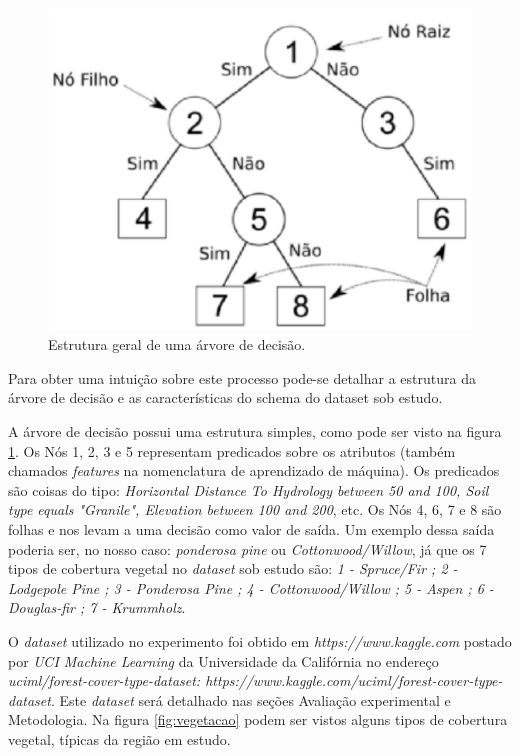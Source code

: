 \documentclass[12pt]{article}
\begin{document}
\begin{figure}[!ht]
	\centering
	\begin{minipage}[t]{0.35\textwidth}
        \includegraphics[width=\textwidth]{img/arvore.png}
        \centering
	\end{minipage}
	\caption
	{
	    Estrutura geral de uma árvore de decisão.
	}
	\label{fig:arvore}
\end{figure}

Para obter uma intuição sobre este processo pode-se detalhar a estrutura da árvore de decisão e as características do schema do dataset sob estudo.  

A árvore de decisão possui uma estrutura simples, como pode ser visto na figura \ref{fig:arvore}.  Os Nós 1, 2, 3 e 5 representam predicados sobre os atributos (também chamados \emph{features} na nomenclatura de aprendizado de máquina). Os predicados são coisas do tipo: \emph{Horizontal Distance To Hydrology between 50 and 100, Soil type equals "Granile", Elevation between 100 and 200}, etc.
Os Nós 4, 6, 7 e 8 são folhas e nos levam a uma decisão como valor de saída. Um exemplo dessa saída poderia ser, no nosso caso: \emph{ponderosa pine} ou \emph{Cottonwood/Willow}, já que os 7 tipos de cobertura vegetal no \emph{dataset} sob estudo são:
\emph{1 - Spruce/Fir ; 2 - Lodgepole Pine  ; 3 - Ponderosa Pine  ; 4 - Cottonwood/Willow  ; 5 - Aspen  ;   6 - Douglas-fir  ;  7 - Krummholz}.

O \emph{dataset} utilizado no experimento foi obtido em \emph{https://www.kaggle.com}  postado por \emph{UCI Machine Learning} da Universidade da Califórnia no endereço \emph{uciml/forest-cover-type-dataset:
https://www.kaggle.com/uciml/forest-cover-type-dataset}. Este \emph{dataset} será detalhado nas seções Avaliação experimental e Metodologia.  Na figura \ref{fig:vegetacao} podem ser vistos alguns tipos de cobertura vegetal, típicas da região em estudo.
\end{document}

